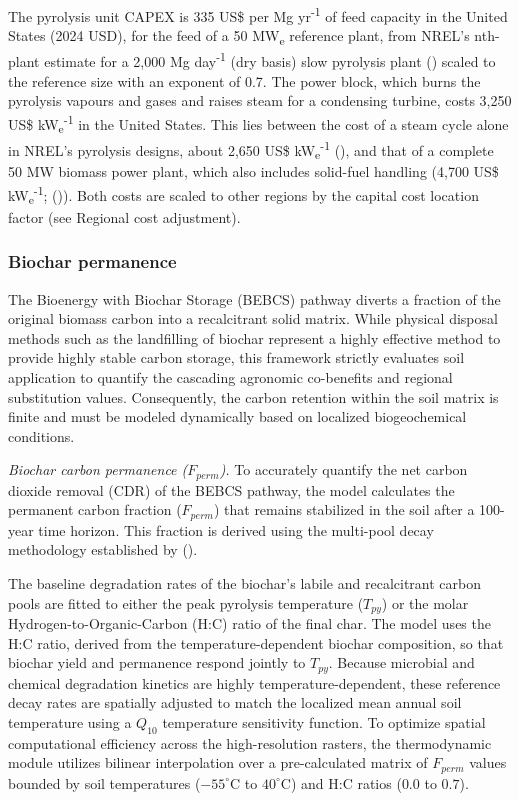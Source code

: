 \documentclass[
  letterpaper,
]{article}
\begin{document}
The pyrolysis unit CAPEX is 335 US\$ per Mg yr\textsuperscript{-1} of
feed capacity in the United States (2024 USD), for the feed of a 50
MW\textsubscript{e} reference plant, from NREL's nth-plant estimate for
a 2,000 Mg day\textsuperscript{-1} (dry basis) slow pyrolysis plant
() scaled to the reference size with
an exponent of 0.7. The power block, which burns the pyrolysis vapours
and gases and raises steam for a condensing turbine, costs 3,250 US\$
kW\textsubscript{e}\textsuperscript{-1} in the United States. This lies
between the cost of a steam cycle alone in NREL's pyrolysis designs,
about 2,650 US\$ kW\textsubscript{e}\textsuperscript{-1}
(), and that of a complete 50 MW
biomass power plant, which also includes solid-fuel handling (4,700 US\$
kW\textsubscript{e}\textsuperscript{-1};
()). Both costs are scaled to other
regions by the capital cost location factor (see Regional cost
adjustment).

\subsubsection{Biochar permanence}\label{biochar-permanence}

The Bioenergy with Biochar Storage (BEBCS) pathway diverts a fraction of
the original biomass carbon into a recalcitrant solid matrix. While
physical disposal methods such as the landfilling of biochar represent a
highly effective method to provide highly stable carbon storage, this
framework strictly evaluates soil application to quantify the cascading
agronomic co-benefits and regional substitution values. Consequently,
the carbon retention within the soil matrix is finite and must be
modeled dynamically based on localized biogeochemical conditions.

\emph{Biochar carbon permanence (\(F_{perm}\)).} To accurately quantify
the net carbon dioxide removal (CDR) of the BEBCS pathway, the model
calculates the permanent carbon fraction (\(F_{perm}\)) that remains
stabilized in the soil after a 100-year time horizon. This fraction is
derived using the multi-pool decay methodology established by
().

The baseline degradation rates of the biochar's labile and recalcitrant
carbon pools are fitted to either the peak pyrolysis temperature
(\(T_{py}\)) or the molar Hydrogen-to-Organic-Carbon (H:C) ratio of the
final char. The model uses the H:C ratio, derived from the
temperature-dependent biochar composition, so that biochar yield and
permanence respond jointly to \(T_{py}\). Because microbial and chemical
degradation kinetics are highly temperature-dependent, these reference
decay rates are spatially adjusted to match the localized mean annual
soil temperature using a \(Q_{10}\) temperature sensitivity function. To
optimize spatial computational efficiency across the high-resolution
rasters, the thermodynamic module utilizes bilinear interpolation over a
pre-calculated matrix of \(F_{perm}\) values bounded by soil
temperatures (\(-55^\circ\text{C}\) to \(40^\circ\text{C}\)) and H:C
ratios (\(0.0\) to \(0.7\)).
\end{document}
